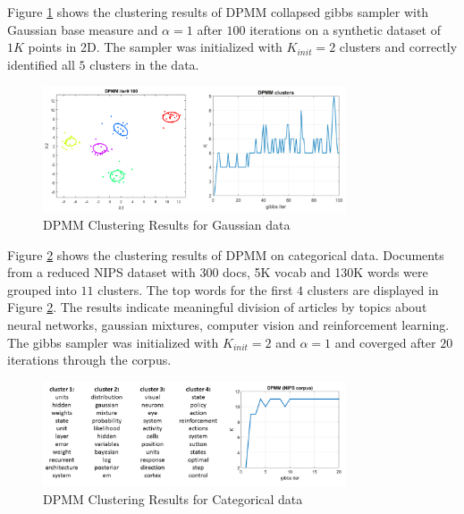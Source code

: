 Figure \ref{fig:dp_results} shows the clustering results of DPMM collapsed gibbs sampler with Gaussian base measure and $\alpha=1$ after $100$ iterations on a synthetic dataset of $1K$ points in 2D. The sampler was initialized with $K_{init}=2$ clusters and correctly identified all $5$ clusters in the data.

\begin{figure}[thpb]
    \centering
    \includegraphics[width=0.8\textwidth, trim={10 10 10 10}]{figures/dp_results.png}
    \caption{DPMM Clustering Results for Gaussian data}
    \label{fig:dp_results}
\end{figure}

Figure \ref{fig:dp_results2} shows the clustering results of DPMM on categorical data. Documents from a reduced NIPS dataset with 300 docs, 5K vocab and 130K words were grouped into $11$ clusters. The top words for the first $4$ clusters are displayed in Figure \ref{fig:dp_results2}. The results indicate meaningful division of articles by topics about neural networks, gaussian mixtures, computer vision and reinforcement learning. The gibbs sampler was initialized with $K_{init}=2$ and $\alpha=1$ and coverged after $20$ iterations through the corpus.   

\begin{figure}[thpb]
    \centering
    \includegraphics[width=0.8\textwidth, trim={10 10 10 10}]{figures/dp_results2.png}
    \caption{DPMM Clustering Results for Categorical data}
    \label{fig:dp_results2}
\end{figure}



